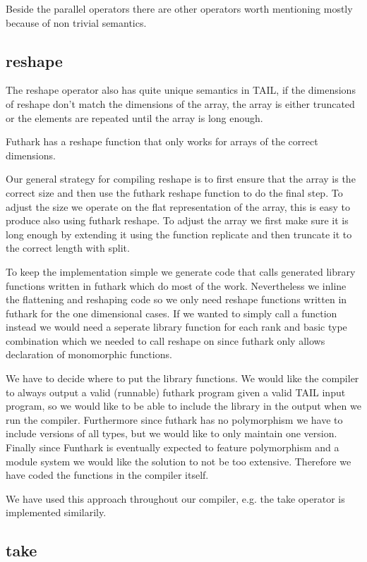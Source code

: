 \documentclass[11pt]{article}
\begin{document}
Beside the parallel operators there are other operators worth mentioning mostly because of non trivial semantics.  

\subsection{reshape}

The reshape operator also has quite unique semantics in TAIL, if the dimensions of reshape don't match the dimensions of the array, the
array is either truncated or the elements are repeated until the array is long enough.

Futhark has a reshape function that only works for arrays of the correct dimensions.

Our general strategy for compiling reshape is to first ensure that the array is the correct size and then use the futhark reshape
function to do the final step. To adjust the size we operate on the flat representation of the array, this is easy to produce also
using futhark reshape. To adjust the array we first make sure it is long enough by extending it using the function replicate and then
truncate it to the correct length with split.

To keep the implementation simple we generate code that calls generated library functions written in futhark which do most of the work.
Nevertheless we inline the flattening and reshaping code so we only need reshape functions written in futhark
for the one dimensional cases. If we wanted to simply call a function instead we would need a seperate library function for each
rank and basic type combination which we needed to call reshape on since futhark only allows declaration of monomorphic functions.

We have to decide where to put the library functions.
We would like the compiler to always output a valid (runnable) futhark program given a valid TAIL input program, so we would like to
be able to include the library in the output when we run the compiler.
Furthermore since futhark has no polymorphism we have to include versions of all types, but we would like to only maintain one version.
Finally since Funthark is eventually expected to feature polymorphism and a module system we would like the solution to not be too
extensive. Therefore we have coded the functions in the compiler itself.

We have used this approach throughout our compiler, e.g. the take operator is implemented similarily.
\subsection{take} 
\end{document}
